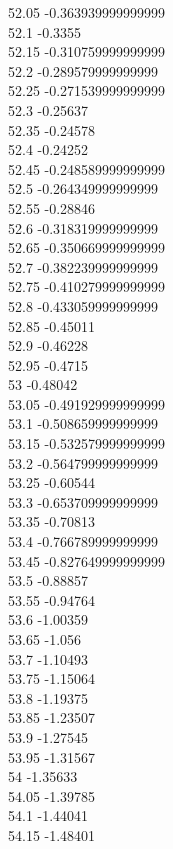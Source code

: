 {52.05	-0.363939999999999\\
52.1	-0.3355\\
52.15	-0.310759999999999\\
52.2	-0.289579999999999\\
52.25	-0.271539999999999\\
52.3	-0.25637\\
52.35	-0.24578\\
52.4	-0.24252\\
52.45	-0.248589999999999\\
52.5	-0.264349999999999\\
52.55	-0.28846\\
52.6	-0.318319999999999\\
52.65	-0.350669999999999\\
52.7	-0.382239999999999\\
52.75	-0.410279999999999\\
52.8	-0.433059999999999\\
52.85	-0.45011\\
52.9	-0.46228\\
52.95	-0.4715\\
53	-0.48042\\
53.05	-0.491929999999999\\
53.1	-0.508659999999999\\
53.15	-0.532579999999999\\
53.2	-0.564799999999999\\
53.25	-0.60544\\
53.3	-0.653709999999999\\
53.35	-0.70813\\
53.4	-0.766789999999999\\
53.45	-0.827649999999999\\
53.5	-0.88857\\
53.55	-0.94764\\
53.6	-1.00359\\
53.65	-1.056\\
53.7	-1.10493\\
53.75	-1.15064\\
53.8	-1.19375\\
53.85	-1.23507\\
53.9	-1.27545\\
53.95	-1.31567\\
54	-1.35633\\
54.05	-1.39785\\
54.1	-1.44041\\
54.15	-1.48401\\
}
